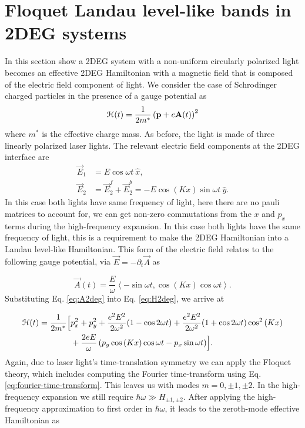 \section{Floquet Landau level-like bands in 2DEG systems}
In this section show a 2DEG system with a non-uniform circularly polarized light becomes an effective 2DEG Hamiltonian with a magnetic field that is composed of the electric field component of light.
We consider the case of Schrodinger charged particles in the presence of a gauge potential as
\begin{equation}\label{eq:H2deg}
  \mathcal{H}(t) = \dfrac{1}{2m^*} \left( \mathbf{p} + e \mathbf{A}(t)\right)^2
\end{equation}
where $m^*$ is the effective charge mass.
As before, the light is made of three linearly polarized laser lights.
The relevant electric field components at the 2DEG interface are
\begin{align} \label{eq:E2field}
  \vec{E}_{1} &= E \cos{\omega t}\ \hat{x}, \nonumber \\
  \vec{E}_{2} &= \vec{E}_2^f + \vec{E}_2^b = -E\cos{(K x)} \sin{\omega t}\ \hat{y}.
\end{align}%
In this case both lights have same frequency of light, here there are no pauli matrices to account for, we can get non-zero commutations from the $x$ and $p_x$ terms during the high-frequency expansion.
In this case both lights have the same frequency of light, this is a requirement to make the 2DEG Hamiltonian into a Landau level-like Hamiltonian.
This form of the electric field relates to the following gauge potential, via $\vec{E} = -\partial_t \vec{A}$ as

\begin{equation}\label{eq:A2deg}
  \vec{A}(t)= \dfrac{E}{\omega} \left\langle -\sin \omega t, \cos{(Kx)} \cos{\omega t} \right\rangle.
\end{equation}%
Substituting Eq. \eqref{eq:A2deg} into Eq. \eqref{eq:H2deg}, we arrive at

\begin{align}\label{eq:H2time}
  \mathcal{H}(t) = \dfrac{1}{2m^*} \Bigl[ &p_x^2 + p_y^2 + \dfrac{e^2 E^2}{2\omega^2}(1-\cos{2\omega t}) + \dfrac{e^2 E^2}{2\omega^2}(1+\cos{2\omega t}) \cos^2{(Kx)} \nonumber \\
  &+\dfrac{2eE}{\omega} \left(p_y \cos{(Kx)}\cos{\omega t} -  p_x \sin{\omega t}\right) \Bigr].
\end{align}
Again, due to laser light's time-translation symmetry we can apply the Floquet theory, which includes computing the Fourier time-transform using Eq. \eqref{eq:fourier-time-transform}.
This leaves us with modes $m=0,\pm1,\pm2$.
In the high-frequency expansion we still require $\hbar \omega \gg H_{\pm1,\pm2}$.
After applying the high-frequency approximation to first order in $\hbar \omega$, it leads to the zeroth-mode effective Hamiltonian as


